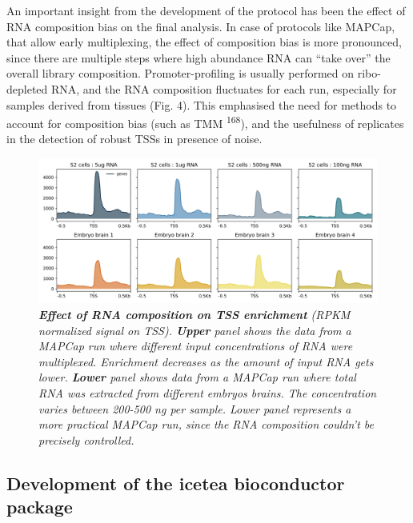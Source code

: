 \documentclass[11pt,twoside]{MPIthesis}
\theoremstyle{definition}
\theoremstyle{definition}
\theoremstyle{definition}
\theoremstyle{remark}
\begin{document}
An important insight from the development of the protocol has been the
effect of RNA composition bias on the final analysis. In case of
protocols like MAPCap, that allow early multiplexing, the effect of
composition bias is more pronounced, since there are multiple steps
where high abundance RNA can ``take over'' the overall library
composition. Promoter-profiling is usually performed on ribo-depleted
RNA, and the RNA composition fluctuates for each run, especially for
samples derived from tissues (Fig. 4). This emphasised the need for
methods to account for composition bias (such as TMM
\textsuperscript{168}), and the usefulness of replicates in the
detection of robust TSSs in presence of noise.
\begin{figure}

{\centering \includegraphics[width=0.9\linewidth]{figures/results_fig5} 

}

\caption[Effect of RNA composition on TSS enrichment]{\emph{\textbf{Effect of RNA composition on TSS enrichment}
(RPKM normalized signal on TSS). \textbf{Upper} panel shows the data
from a MAPCap run where different input concentrations of RNA were
multiplexed. Enrichment decreases as the amount of input RNA gets lower.
\textbf{Lower} panel shows data from a MAPCap run where total RNA was
extracted from different embryos brains. The concentration varies
between 200-500 ng per sample. Lower panel represents a more practical
MAPCap run, since the RNA composition couldn't be precisely controlled.}}\label{fig:unnamed-chunk-10}
\end{figure}









\subsection{Development of the icetea bioconductor
package}\label{development-of-the-icetea-bioconductor-package}
\end{document}
